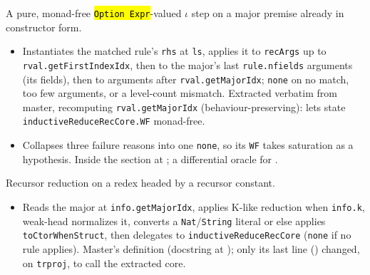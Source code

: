 \begin{definition}
\label{def:kernel-iota-core}
 
\leanok
{}

 A pure, monad-free \hl{\texttt{Option Expr}}-valued $\iota$ step on a major
premise already in constructor form.
\begin{itemize}
\item Instantiates the matched rule's \texttt{rhs} at \texttt{ls}, applies it to \texttt{recArgs}
up to \texttt{rval.getFirstIndexIdx}, then to the major's last \texttt{rule.nfields} arguments
(its fields), then to arguments after \texttt{rval.getMajorIdx}; \texttt{none} on no match, too
few arguments, or a level-count mismatch. Extracted verbatim from master, recomputing
\texttt{rval.getMajorIdx} (behaviour-preserving): lets
 state \texttt{inductiveReduceRecCore.WF}
monad-free.
\item {} Collapses three failure reasons into one \texttt{none}, so its \texttt{WF}
takes saturation as a hypothesis. Inside the section at ;
a differential oracle for .
\end{itemize}
\end{definition}

\begin{definition}
\label{def:kernel-inductive-reduce-rec}
 
\leanok
{}

 Recursor reduction on a redex headed by a recursor constant.
\begin{itemize}
\item Reads the major at \texttt{info.getMajorIdx}, applies K-like reduction when
\texttt{info.k}, weak-head normalizes it, converts a \texttt{Nat}/\texttt{String} literal or else
applies \texttt{toCtorWhenStruct}, then delegates to \texttt{inductiveReduceRecCore}
(\texttt{none} if no rule applies). Master's definition (docstring at
); only its last line
() changed, on \texttt{trproj}, to call the
extracted core.
\end{itemize}
\end{definition}

